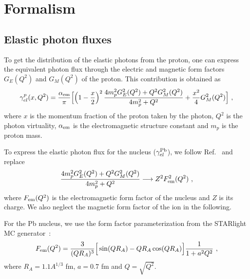 \section{Formalism}

\subsection{Elastic photon fluxes}

To get the distribution of the elastic photons from the proton, one can express the equivalent photon flux through
the electric and magnetic form factors $G_E(Q^2)$ and $G_M(Q^2)$ of the proton.
This contribution is obtained as
\begin{eqnarray}
  \gamma^{p}_{el}(x,Q^2) = \frac{\alpha_{\rm{em}}}{\pi}
\Big[ \Big( 1- {x \over 2} \Big)^2 \, {4 m_p^2 G_E^2(Q^2) + Q^2 G_M^2(Q^2) \over 4m_p^2 + Q^2} + {x^2 \over 4} G_M^2(Q^2) \Big]~,
\label{proton_el_flux}
\end{eqnarray}
where $x$ is the momentum fraction of the proton taken by the photon, $Q^2$ is the photon virtuality, $\alpha_{\rm{em}}$ is the electromagnetic structure constant and $m_p$ is the proton mass.

To express the elastic photon flux for the nucleus ($\gamma^{\rm Pb}_{el}$), we follow Ref.~\cite{Budnev:1974de} and replace 
\begin{eqnarray}
 {4 m_p^2 G_E^2(Q^2) + Q^2 G_M^2(Q^2) \over 4m_p^2 + Q^2} \longrightarrow Z^2 F_{\rm em}^2(Q^2)~,
 \end{eqnarray}
where $F_{\rm em}(Q^2)$ is the electromagnetic form factor of the nucleus and $Z$ is its charge.
We also neglect the magnetic form factor of the ion in the following.

For the Pb nucleus, we use the form factor parameterization from the STARlight MC generator~\cite{Klein:2016yzr}:
\begin{eqnarray}
 F_{\rm em}(Q^2) = {3 \over (QR_A)^3}\Big[ \sin(QR_A) - QR_A \cos(QR_A) \Big] { 1 \over 1 + a^2 Q^2}~,
\end{eqnarray}
where $R_A = 1.1 A^{1/3}$ fm, $a = 0.7$ fm and $Q = \sqrt{Q^2}$.

